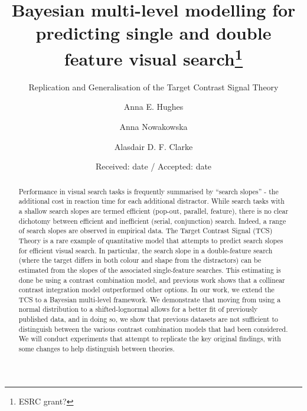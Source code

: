 \documentclass[smallextended, natbib]{svjour3}       %
\begin{document}
\title{Bayesian multi-level modelling for predicting single and double feature visual search\thanks{ESRC grant?}
}
\subtitle{Replication and Generalisation of the Target Contrast Signal Theory}


\author{Anna E. Hughes \and Anna Nowakowska \and Alasdair D. F. Clarke}



\date{Received: date / Accepted: date}

\maketitle

\begin{abstract}
Performance in visual search tasks is frequently summarised by ``search slopes'' - the additional cost in reaction time for each additional distractor. While search tasks with a shallow search slopes are termed efficient (pop-out, parallel, feature), there is no clear dichotomy between efficient and inefficient (serial, conjunction) search. Indeed, a range of search slopes are observed in empirical data. The Target Contrast Signal (TCS) Theory is a rare example of quantitative model that attempts to predict search slopes for efficient visual search. In particular, the search slope in a double-feature search (where the target differs in both colour and shape from the distractors) can be estimated from the slopes of the associated single-feature searches. This estimating is done be using a contrast combination model, and previous work shows that a collinear contrast integration model outperformed other options. In our work, we extend the TCS to a Bayesian multi-level framework. We demonstrate that moving from using a normal distribution to a shifted-lognormal allows for a better fit of previously published data, and in doing so, we show that previous datasets are not sufficient to distinguish between the various contrast combination models that had been considered. We will conduct experiments that attempt to replicate the key original findings, with some changes to help distinguish between theories. 

\end{abstract}
\end{document}
